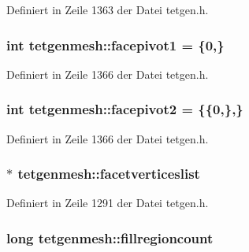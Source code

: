 Definiert in Zeile 1363 der Datei tetgen.\-h.

\hypertarget{classtetgenmesh_af459523fb697a18a4cfd384a15eea491}{
\subsubsection[{facepivot1}]{\setlength{\rightskip}{0pt plus 5cm}int tetgenmesh\-::facepivot1 = \{0,\}\hspace{0.3cm}{\ttfamily [static]}}}\label{classtetgenmesh_af459523fb697a18a4cfd384a15eea491}


Definiert in Zeile 1366 der Datei tetgen.\-h.

\hypertarget{classtetgenmesh_abbb55c1b21510a209fd860e8c18a79d1}{
\subsubsection[{facepivot2}]{\setlength{\rightskip}{0pt plus 5cm}int tetgenmesh\-::facepivot2 = \{\{0,\},\}\hspace{0.3cm}{\ttfamily [static]}}}\label{classtetgenmesh_abbb55c1b21510a209fd860e8c18a79d1}


Definiert in Zeile 1366 der Datei tetgen.\-h.

\hypertarget{classtetgenmesh_ae81c6bea0222ac8e6798145d999bf487}{
\subsubsection[{facetverticeslist}]{$\ast$ tetgenmesh\-::facetverticeslist}}\label{classtetgenmesh_ae81c6bea0222ac8e6798145d999bf487}


Definiert in Zeile 1291 der Datei tetgen.\-h.

\hypertarget{classtetgenmesh_a0a8e70333a9912cb0e212bc9d7ec648f}{
\subsubsection[{fillregioncount}]{\setlength{\rightskip}{0pt plus 5cm}long tetgenmesh\-::fillregioncount}}\label{classtetgenmesh_a0a8e70333a9912cb0e212bc9d7ec648f}


